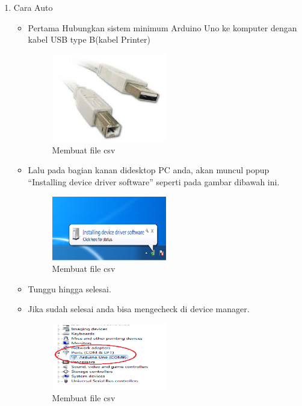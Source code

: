 \begin{enumerate}
    \item Cara Auto
    \begin{itemize}
        \item Pertama Hubungkan sistem minimum Arduino Uno ke komputer dengan kabel USB type B(kabel Printer)
        \begin{figure}[H]	
            \includegraphics[width=5cm]{figures/5/1174070/teori/1.jpg}
            \centering
            \caption{Membuat file csv}
        \end{figure}

        \item Lalu pada bagian kanan didesktop PC anda, akan muncul popup “Installing device driver software” seperti pada gambar dibawah ini.
        \begin{figure}[H]	
            \includegraphics[width=5cm]{figures/5/1174070/teori/2.png}
            \centering
            \caption{Membuat file csv}
        \end{figure}

        \item Tunggu hingga selesai.
        \item Jika sudah selesai anda bisa mengecheck di device manager.
        \begin{figure}[H]	
            \includegraphics[width=5cm]{figures/5/1174070/teori/11.png}
            \centering
            \caption{Membuat file csv}
        \end{figure}
    \end{itemize}


\end{enumerate}
